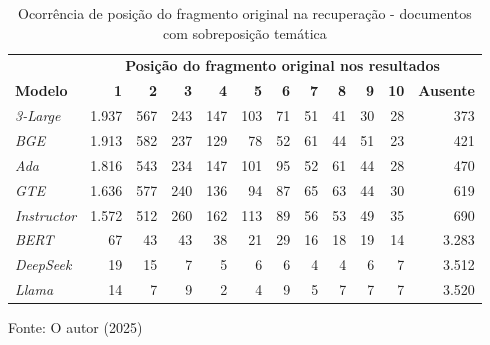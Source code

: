 \begin{table}[H]
    \caption{Ocorrência de posição do fragmento original na recuperação - documentos com sobreposição temática}
    \centering
    \begin{tabular}{ l r r r r r r r r r r r }
        \hline
            & \multicolumn{11}{c}{\textbf{Posição do fragmento original nos resultados}} \\
        \textbf{Modelo} & \textbf{1} & \textbf{2} & \textbf{3} & \textbf{4} & \textbf{5} & \textbf{6} & \textbf{7} & \textbf{8} & \textbf{9} & \textbf{10} & \textbf{Ausente} \\  
        \hline
        \textit{3-Large} & 1.937 & 567 & 243 & 147 & 103 & 71 & 51 & 41 & 30 & 28 & 373 \\
        \textit{BGE} & 1.913 & 582 & 237 & 129 & 78 & 52 & 61 & 44 & 51 & 23 & 421 \\
        \textit{Ada} & 1.816 & 543 & 234 & 147 & 101 & 95 & 52 & 61 & 44 & 28 & 470 \\
        \textit{GTE} & 1.636 & 577 & 240 & 136 & 94 & 87 & 65 & 63 & 44 & 30 & 619 \\
        \textit{Instructor} & 1.572 & 512 & 260 & 162 & 113 & 89 & 56 & 53 & 49 & 35 & 690 \\
        \textit{BERT} & 67 & 43 & 43 & 38 & 21 & 29 & 16 & 18 & 19 & 14 & 3.283 \\
        \textit{DeepSeek} & 19 & 15 & 7 & 5 & 6 & 6 & 4 & 4 & 6 & 7 & 3.512 \\
        \textit{Llama} & 14 & 7 & 9 & 2 & 4 & 9 & 5 & 7 & 7 & 7 & 3.520 \\

        \hline
    \end{tabular}
    
    Fonte: O autor (2025)
    \label{tab:recuperacao-rank-markdown}
\end{table}

